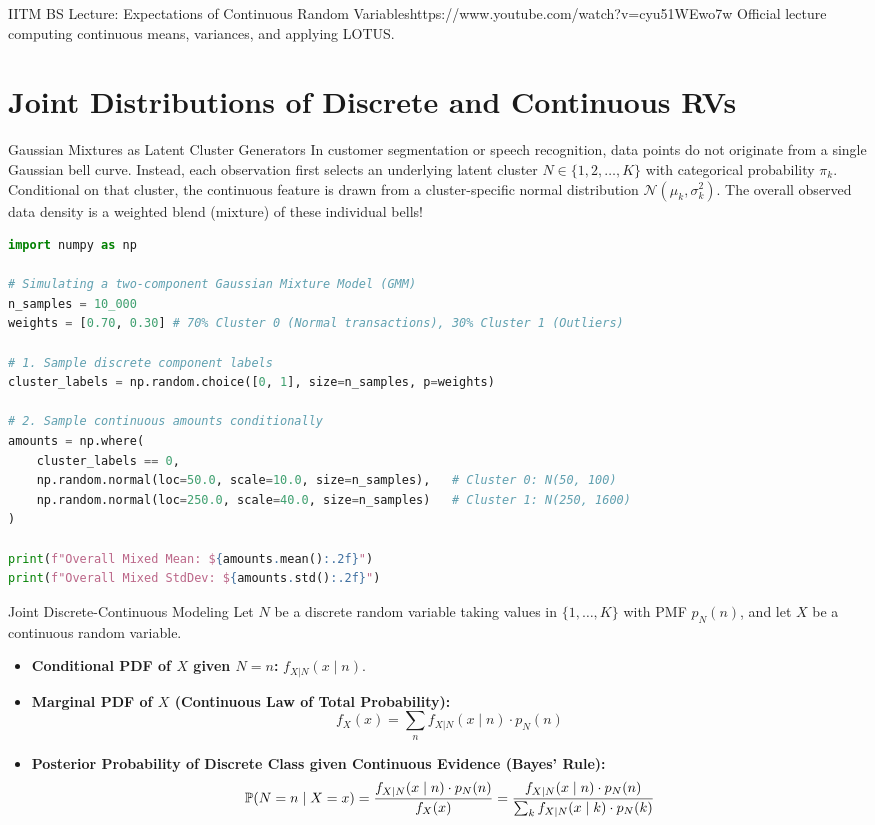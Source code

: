 \begin{videocard}{IITM BS Lecture: Expectations of Continuous Random Variables}{https://www.youtube.com/watch?v=cyu51WEwo7w}
Official lecture computing continuous means, variances, and applying LOTUS.
\end{videocard}

\section{Joint Distributions of Discrete and Continuous RVs}

\begin{intuitionbox}{Gaussian Mixtures as Latent Cluster Generators}
In customer segmentation or speech recognition, data points do not originate from a single Gaussian bell curve. Instead, each observation first selects an underlying latent cluster $N \in \{1, 2, \dots, K\}$ with categorical probability $\pi_k$. Conditional on that cluster, the continuous feature is drawn from a cluster-specific normal distribution $\mathcal{N}(\mu_k, \sigma_k^2)$. The overall observed data density is a weighted blend (mixture) of these individual bells!
\end{intuitionbox}

\begin{lstlisting}[language=Python, caption=Data Science: Simulating and Visualizing a Gaussian Mixture Model]
import numpy as np

# Simulating a two-component Gaussian Mixture Model (GMM)
n_samples = 10_000
weights = [0.70, 0.30] # 70% Cluster 0 (Normal transactions), 30% Cluster 1 (Outliers)

# 1. Sample discrete component labels
cluster_labels = np.random.choice([0, 1], size=n_samples, p=weights)

# 2. Sample continuous amounts conditionally
amounts = np.where(
    cluster_labels == 0,
    np.random.normal(loc=50.0, scale=10.0, size=n_samples),   # Cluster 0: N(50, 100)
    np.random.normal(loc=250.0, scale=40.0, size=n_samples)   # Cluster 1: N(250, 1600)
)

print(f"Overall Mixed Mean: ${amounts.mean():.2f}")
print(f"Overall Mixed StdDev: ${amounts.std():.2f}")
\end{lstlisting}

\begin{definitionbox}{Joint Discrete-Continuous Modeling}
Let $N$ be a discrete random variable taking values in $\{1, \dots, K\}$ with PMF $p_N(n)$, and let $X$ be a continuous random variable.
\begin{itemize}
    \item \textbf{Conditional PDF of $X$ given $N=n$:} $f_{X|N}(x \mid n)$.
    \item \textbf{Marginal PDF of $X$ (Continuous Law of Total Probability):}
    $$f_X(x) = \sum_{n} f_{X|N}(x \mid n) \cdot p_N(n)$$
    \item \textbf{Posterior Probability of Discrete Class given Continuous Evidence (Bayes' Rule):}
    $$\P(N = n \mid X = x) = \frac{f_{X|N}(x \mid n) \cdot p_N(n)}{f_X(x)} = \frac{f_{X|N}(x \mid n) \cdot p_N(n)}{\sum_{k} f_{X|N}(x \mid k) \cdot p_N(k)}$$
\end{itemize}
\end{definitionbox}

